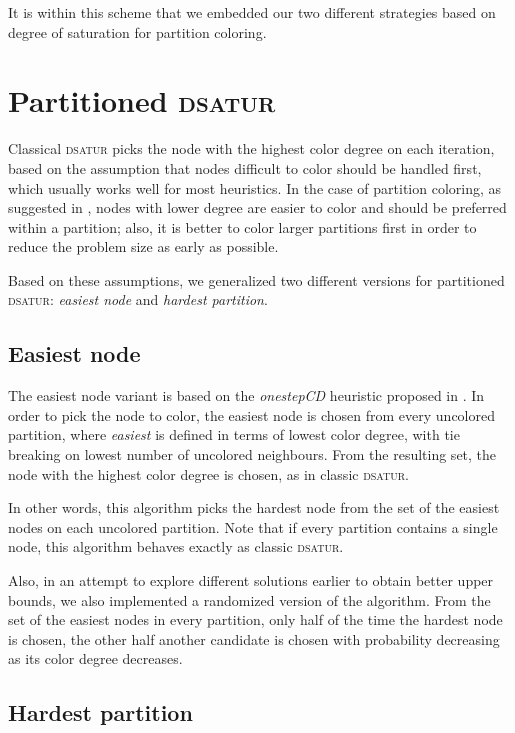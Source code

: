 It is within this scheme that we embedded our two different strategies based on degree of saturation for partition coloring.

\section{Partitioned \textsc{dsatur}}
\label{subsec:heur:pdsatur}

Classical \textsc{dsatur} picks the node with the highest color degree on each iteration, based on the assumption that nodes difficult to color should be handled first, which usually works well for most heuristics. In the case of partition coloring, as suggested in \cite{Li00thepartition}, nodes with lower degree are easier to color and should be preferred within a partition; also, it is better to color larger partitions first in order to reduce the problem size as early as possible.

Based on these assumptions, we generalized two different versions for partitioned \textsc{dsatur}: \textit{easiest node} and \textit{hardest partition}.

\subsection{Easiest node}

The easiest node variant is based on the \textit{onestepCD} heuristic proposed in \cite{Li00thepartition}. In order to pick the node to color, the easiest node is chosen from every uncolored partition, where \textit{easiest} is defined in terms of lowest color degree, with tie breaking on lowest number of uncolored neighbours. From the resulting set, the node with the highest color degree is chosen, as in classic \textsc{dsatur}. 

In other words, this algorithm picks the hardest node from the set of the easiest nodes on each uncolored partition. Note that if every partition contains a single node, this algorithm behaves exactly as classic \textsc{dsatur}.

Also, in an attempt to explore different solutions earlier to obtain better upper bounds, we also implemented a randomized version of the algorithm. From the set of the easiest nodes in every partition, only half of the time the hardest node is chosen, the other half another candidate is chosen with probability decreasing as its color degree decreases.

\subsection{Hardest partition}

